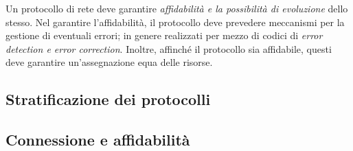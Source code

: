 \documentclass{subfiles}
\begin{document}
Un protocollo di rete deve garantire \emph{affidabilità \emph{e la possibilità di} evoluzione} dello stesso.
Nel garantire l'affidabilità, il protocollo deve prevedere meccanismi per la gestione di eventuali errori;
in genere realizzati per mezzo di codici di \emph{error detection \emph{e} error correction}.
Inoltre, affinché il protocollo sia affidabile, questi deve garantire un'assegnazione equa delle risorse.

\subsection{Stratificazione dei protocolli}


\subsection{Connessione e affidabilità}

\clearpage
\end{document}
